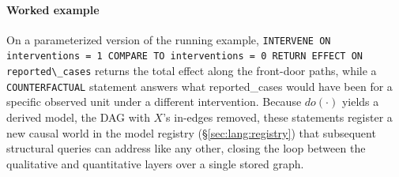 \paragraph{Worked example}
On a parameterized version of the running example, \lstinline[style=causaldsl]|INTERVENE ON interventions = 1 COMPARE TO interventions = 0 RETURN EFFECT ON reported\_cases|
returns the total effect along the front-door paths, while a
\lstinline[style=causaldsl]|COUNTERFACTUAL| statement answers what
\textsf{reported\_cases} would have been for a specific observed unit under a
different intervention. Because $do(\cdot)$ yields a derived model, the DAG with
$X$'s in-edges removed, these statements register a new causal world in the
model registry (\S\ref{sec:lang:registry}) that subsequent structural queries can
address like any other, closing the loop between the qualitative and quantitative
layers over a single stored graph.
